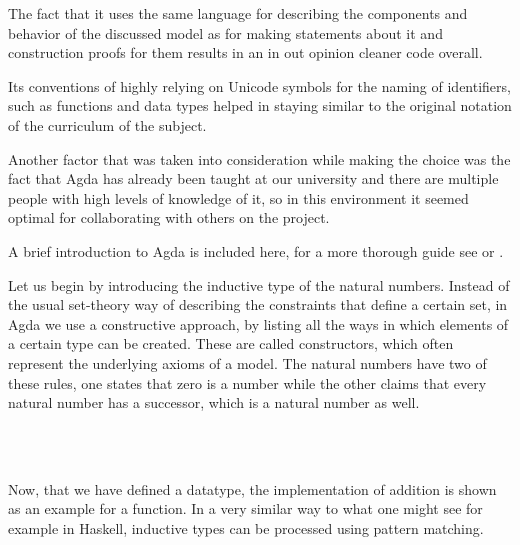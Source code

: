 The fact that it uses the same language for describing the components and behavior of the discussed model as for making statements about it and construction proofs for them results in an in out opinion cleaner code overall.

Its conventions of highly relying on Unicode symbols for the naming of identifiers, such as functions and data types helped in staying similar to the original notation of the curriculum of the subject.

Another factor that was taken into consideration while making the choice was the fact that Agda has already been taught at our university and there are multiple people with high levels of knowledge of it, so in this environment it seemed optimal for collaborating with others on the project.

A brief introduction to Agda is included here, for a more thorough guide see \cite{bove2009brief} or \cite{norell2008dependently}.

Let us begin by introducing the inductive type of the natural numbers. Instead of the usual set-theory way of describing the constraints that define a certain set, in Agda we use a constructive approach, by listing all the ways in which elements of a certain type can be created. These are called constructors, which often represent the underlying axioms of a model. The natural numbers have two of these rules, one states that zero is a number while the other claims that every natural number has a successor, which is a natural number as well.

\begin{code}
    \>[0]\AgdaSpace{}%
    \AgdaSpace{}%
    \AgdaSymbol{:}\AgdaSpace{}%
    \AgdaSpace{}%
    \<%
    \\
    \>[0][@{}l@{\AgdaIndent{0}}]%
    \>[2]\AgdaSpace{}%
    \AgdaSymbol{:}\AgdaSpace{}%
    \<%
    \\
    \>[2]%
    \>[7]\AgdaSymbol{:}\AgdaSpace{}%
    \AgdaSymbol{(}\AgdaSpace{}%
    \AgdaSymbol{:}\AgdaSpace{}%
    \AgdaSymbol{)}\AgdaSpace{}%
    \AgdaSpace{}%
    \<%
\end{code}

Now, that we have defined a datatype, the implementation of addition is shown as an example for a function. In a very similar way to what one might see for example in Haskell, inductive types can be processed using pattern matching.

